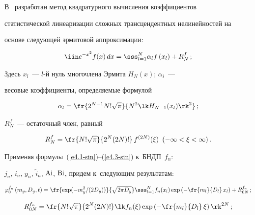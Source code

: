 В~\cite{10-sin} разработан метод квадратурного вычисления коэффициентов 

статистической линеаризации сложных трансцендентных нелинейностей на 

основе следующей эрмитовой аппроксимации:

 \begin{equation}

 \iin e^{-x^2} f(x)\, dx = \sss_{l=1}^N \alpha_l f\left(x_l\right)+R_{N}^{f}\,; 

 \label{e4.1-sin}

 \end{equation}

Здесь $x_l$~--- $l$-й нуль многочлена Эрмита $H_N(x)$; $\alpha_i$~--- 

весовые коэффициенты, определяемые формулой

\begin{equation}

\alpha_l =\fr{2^{N-1} N! \sqrt{\pi}}{N^2 \lk H_{N-1} (x_l)\rk^2}\,;

\label{e4.2-sin}

\end{equation}

$R_N^f$~--- остаточный член, равный

 \begin{equation}

 R_N^f =\fr{N! \sqrt{\pi}}{2^N (2N)!}\, f^{(2N)} (\xi) \enskip 

 (-\infty <\xi<\infty)\,.

 \label{e4.3-sin}

 \end{equation}



Применяя формулы~(\ref{e4.1-sin})--(\ref{e4.3-sin}) к~БНДП~$f_n$: 

$j_n$, $i_n$, $y_n$, $\tilde i_n$, $\mathrm{Ai}$, $\mathrm{Bi}$,  придем к~следующим результатам:

 \begin{equation}

 \varphi_0^{f_n} \left(m_y, D_y,t\right) = 

 \fr{\exp (-m_y^2/(2D_y))}{\sqrt{2\pi D_y}} 

 \sss_{l=1}^N f_n (x_l) \exp \left(-\fr{m_l}{D_l}\, x_l\right) + R_{0N}^{f_n}\,;

 \label{e4.4-sin}

 \end{equation}

 \begin{equation}

 R_{0N}^{f_n} = \fr{ N! \sqrt{\pi}}{2^N (2N)!} \lk f_n (\xi) \exp \left(-\fr{m_l}{D_l}\,

 \xi\right)\rk^{2N}\,;

 \label{e4.5-sin}

 \end{equation}

